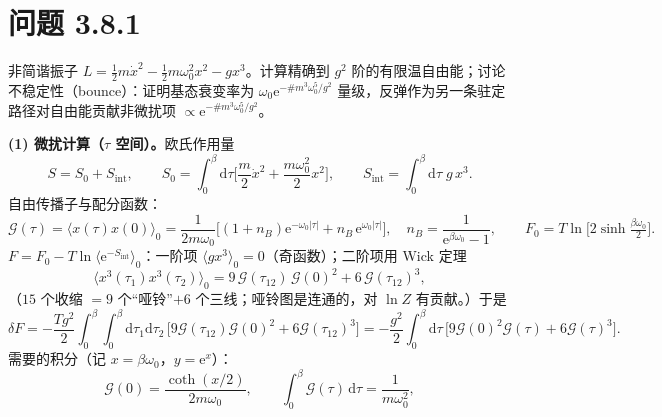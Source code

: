\section*{问题 3.8.1}
\begin{problem}
非简谐振子 $L=\frac12m\dot x^{2}-\frac12m\omega_0^{2}x^{2}-gx^{3}$。计算精确到 $g^{2}$ 阶的有限温自由能；讨论不稳定性（bounce）：证明基态衰变率为 $\omega_0\mathrm{e}^{-\#m^{3}\omega_0^{5}/g^{2}}$ 量级，反弹作为另一条驻定路径对自由能贡献非微扰项 $\propto\mathrm{e}^{-\#m^{3}\omega_0^{5}/g^{2}}$。
\end{problem}
\solution

\textbf{(1) 微扰计算（$\tau$ 空间）。}欧氏作用量
\begin{equation*}
S=S_0+S_{\mathrm{int}},\qquad
S_0=\int_0^{\beta}\mathrm{d}\tau\Big[\frac{m}{2}\dot x^{2}+\frac{m\omega_0^{2}}{2}x^{2}\Big],
\qquad S_{\mathrm{int}}=\int_0^{\beta}\mathrm{d}\tau\;g\,x^{3} .
\end{equation*}
自由传播子与配分函数：
\begin{equation*}
\mathcal{G}(\tau)=\langle x(\tau)x(0)\rangle_0
=\frac{1}{2m\omega_0}\Big[(1+n_B)\mathrm{e}^{-\omega_0|\tau|}+n_B\,\mathrm{e}^{\omega_0|\tau|}\Big],
\quad n_B=\frac{1}{\mathrm{e}^{\beta\omega_0}-1},\qquad
F_0=T\ln\!\big[2\sinh\tfrac{\beta\omega_0}{2}\big] .
\end{equation*}
$F=F_0-T\ln\langle\mathrm{e}^{-S_{\mathrm{int}}}\rangle_0$：一阶项 $\langle gx^{3}\rangle_0=0$（奇函数）；二阶项用 Wick 定理
\begin{equation*}
\big\langle x^{3}(\tau_1)x^{3}(\tau_2)\big\rangle_0
=9\,\mathcal{G}(\tau_{12})\,\mathcal{G}(0)^{2}+6\,\mathcal{G}(\tau_{12})^{3},
\end{equation*}
（$15$ 个收缩 $=9$ 个“哑铃”$+6$ 个三线；哑铃图是连通的，对 $\ln Z$ 有贡献。）于是
\begin{equation*}
\delta F=-\frac{Tg^{2}}{2}\int_0^{\beta}\!\!\int_0^{\beta}\mathrm{d}\tau_1\mathrm{d}\tau_2\,
\big[9\mathcal{G}(\tau_{12})\mathcal{G}(0)^{2}+6\mathcal{G}(\tau_{12})^{3}\big]
=-\frac{g^{2}}{2}\int_0^{\beta}\mathrm{d}\tau\,
\big[9\mathcal{G}(0)^{2}\mathcal{G}(\tau)+6\mathcal{G}(\tau)^{3}\big] .
\end{equation*}
需要的积分（记 $x=\beta\omega_0$，$y=\mathrm{e}^{x}$）：
\begin{equation*}
\mathcal{G}(0)=\frac{\coth(x/2)}{2m\omega_0},\qquad
\int_0^{\beta}\mathcal{G}(\tau)\,\mathrm{d}\tau=\frac{1}{m\omega_0^{2}},
\end{equation*}
